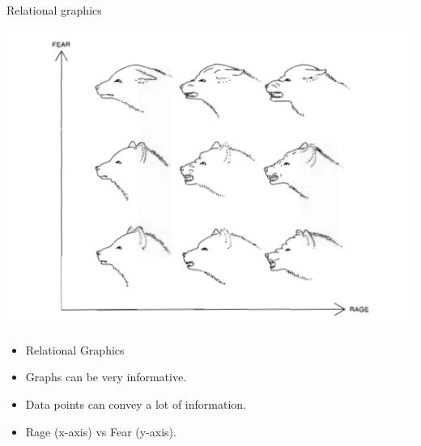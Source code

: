 \documentclass[
  ignorenonframetext,
]{beamer}
\begin{document}
\begin{frame}{Relational graphics}
\protect\hypertarget{relational-graphics-4}{}
\begin{minipage}{0.45\textwidth}
\centering
\includegraphics[width=\textwidth]{excellence_figs/fig_27.png}
\end{minipage}
\hfill
\begin{minipage}{0.5\textwidth}
\footnotesize
\begin{itemize}
  \item Relational Graphics
  \item Graphs can be very informative.
  \item Data points can convey a lot of information.
  \item Rage (x-axis) vs Fear (y-axis).
\end{itemize}
\end{minipage}
\end{frame}
\end{document}

